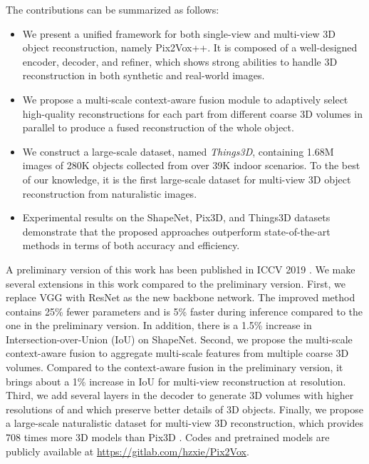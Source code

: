 \documentclass[twocolumn]{svjour3}
\begin{document}
The contributions can be summarized as follows:

\begin{itemize}
  \item We present a unified framework for both single-view and multi-view 3D object reconstruction, namely Pix2Vox++. It is composed of a well-designed encoder, decoder, and refiner, which shows strong abilities to handle 3D reconstruction in both synthetic and real-world images.
  \item We propose a multi-scale context-aware fusion module to adaptively select high-quality reconstructions for each part from different coarse 3D volumes in parallel to produce a fused reconstruction of the whole object.
  \item We construct a large-scale dataset, named {\it Things3D}, containing 1.68M images of 280K objects collected from over 39K indoor scenarios. To the best of our knowledge, it is the first large-scale dataset for multi-view 3D object reconstruction from naturalistic images.
  \item Experimental results on the ShapeNet, Pix3D, and Things3D datasets demonstrate that the proposed approaches outperform state-of-the-art methods in terms of both accuracy and efficiency.
\end{itemize}

A preliminary version of this work has been published in ICCV 2019 \citep{DBLP:conf/iccv/XieHXSS19}.
We make several extensions in this work compared to the preliminary version.
First, we replace VGG \citep{DBLP:conf/iclr/SimonyanZ14a} with ResNet \citep{DBLP:conf/cvpr/HeZRS16} as the new backbone network.
The improved method contains 25\% fewer parameters and is 5\% faster during inference compared to the one in the preliminary version.
In addition, there is a 1.5\% increase in Intersection-over-Union (IoU) on ShapeNet.
Second, we propose the multi-scale context-aware fusion to aggregate multi-scale features from multiple coarse 3D volumes.
Compared to the context-aware fusion in the preliminary version, it brings about a 1\% increase in IoU for multi-view reconstruction at  resolution.
Third, we add several layers in the decoder to generate 3D volumes with higher resolutions of  and  which preserve better details of 3D objects.
Finally, we propose a large-scale naturalistic dataset for multi-view 3D reconstruction, which provides 708 times more 3D models than Pix3D \citep{DBLP:conf/cvpr/Sun0ZZZXTF18}.
Codes and pretrained models are publicly available at 
\url{https://gitlab.com/hzxie/Pix2Vox}.
\end{document}
